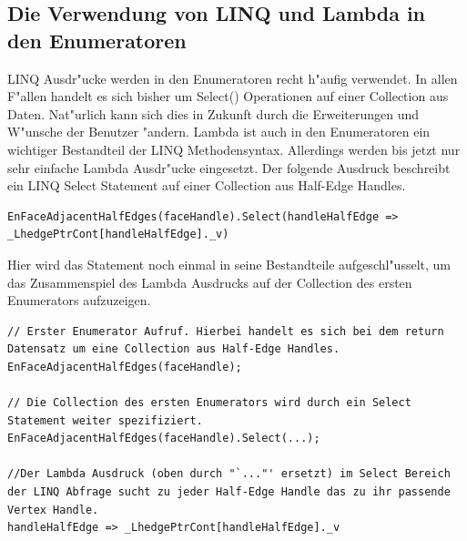 \documentclass[pagesize, paper=a4, fontsize=12pt,titlepage=true, headings=small, headnosepline, abstractoff, liststotoc, nochapterprefix, plainheadsepline]{scrreprt}
\begin{document}
		
		\subsection {Die Verwendung von LINQ und Lambda in den Enumeratoren}
			LINQ Ausdr"ucke werden in den Enumeratoren recht h"aufig verwendet. In allen F"allen handelt es sich bisher um Select() Operationen auf einer Collection aus Daten. Nat"urlich kann sich dies in Zukunft durch die Erweiterungen und W"unsche der Benutzer "andern. Lambda ist auch in den Enumeratoren ein wichtiger Bestandteil der LINQ Methodensyntax. Allerdings werden bis jetzt nur sehr einfache Lambda Ausdr"ucke eingesetzt. Der folgende Ausdruck beschreibt ein LINQ Select Statement auf einer Collection aus Half-Edge Handles.
\begin{lstlisting}
EnFaceAdjacentHalfEdges(faceHandle).Select(handleHalfEdge => _LhedgePtrCont[handleHalfEdge]._v)
\end{lstlisting}

Hier wird das Statement noch einmal in seine Bestandteile aufgeschl"usselt, um das Zusammenspiel des Lambda Ausdrucks auf der Collection des ersten Enumerators aufzuzeigen.

\begin{lstlisting}
// Erster Enumerator Aufruf. Hierbei handelt es sich bei dem return Datensatz um eine Collection aus Half-Edge Handles.
EnFaceAdjacentHalfEdges(faceHandle);

// Die Collection des ersten Enumerators wird durch ein Select Statement weiter spezifiziert.
EnFaceAdjacentHalfEdges(faceHandle).Select(...);

//Der Lambda Ausdruck (oben durch "`..."' ersetzt) im Select Bereich der LINQ Abfrage sucht zu jeder Half-Edge Handle das zu ihr passende Vertex Handle.
handleHalfEdge => _LhedgePtrCont[handleHalfEdge]._v
\end{lstlisting}

\end{document}
